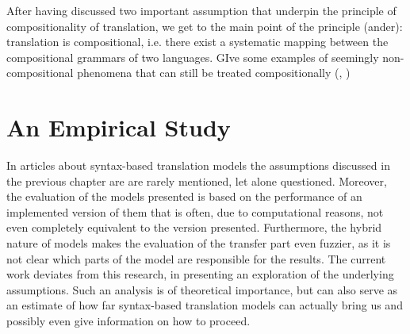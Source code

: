 \documentclass{report}
\theoremstyle{definition}
\theoremstyle{plain}
\begin{document}
After having discussed two important assumption that underpin the principle of compositionality of translation, we get to the main point of the principle (ander): translation is compositional, i.e. there exist a systematic mapping between the compositional grammars of two languages.
GIve some examples of seemingly non-compositional phenomena that can still be treated compositionally (\cite{landsbergen1989power}, \cite{rosetta1994compositional})












%
%

\chapter{An Empirical Study}



In articles about syntax-based translation models the assumptions discussed in the previous chapter are are rarely mentioned, let alone questioned. Moreover, the evaluation of the models presented is based on the performance of an implemented version of them that is often, due to computational reasons, not even completely equivalent to the version presented. Furthermore, the hybrid nature of models makes the evaluation of the transfer part even fuzzier, as it is not clear which parts of the model are responsible for the results. The current work deviates from this research, in presenting an exploration of the underlying assumptions. Such an analysis is of theoretical importance, but can also serve as an estimate of how far syntax-based translation models can actually bring us and possibly even give information on how to proceed.
\end{document}
